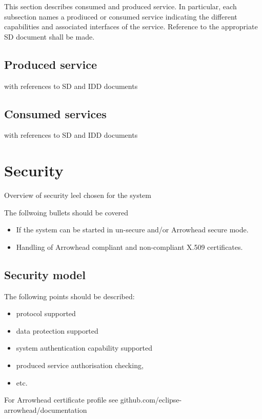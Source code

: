 \documentclass[a4paper]{arrowhead}
\begin{document}
\color{red}
This section describes consumed and produced service.
In particular, each subsection names a prodiuced or consumed service
indicating the different capabilities and associated interfaces of the
service. Reference to the appropriate SD document shall be made.

\subsection{Produced service}
with references to SD and IDD documents

\subsection{Consumed services}
with references to SD and IDD documents

\color{black}




\newpage

\section{Security}
\label{sec:security}


\color{red}
Overview of security leel chosen for the system

The follwoing bullets should be covered 
\begin{itemize}
\item  If the system can be started in un-secure and/or
Arrowhead secure mode.
\item Handling of Arrowhead compliant and
non-compliant X.509 certificates.
\end{itemize}

\subsection {Security model}
The following points should be described:
\begin{itemize}
\item protocol supported 
\item data protection supported 
\item system authentication capability supported
\item produced service authorisation checking, 
\item etc.
\end{itemize}

For Arrowhead certificate profile
see github.com/eclipse-arrowhead/documentation
\color{black}
\end{document}
